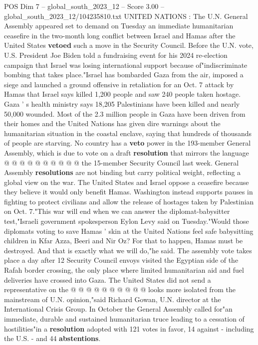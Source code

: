 \begin{textsample}{POS Dim 7 – global\_south\_2023\_12 – Score 3.00 – global\_south\_2023\_12/104235810.txt}  \label{ex:f7_pos_031}
UNITED NATIONS : The U.N.
General Assembly appeared set to demand on Tuesday an immediate humanitarian ceasefire in the two-month long conflict between Israel and Hamas after the United States \textbf{vetoed} such a move in the Security Council.
Before the U.N. vote, U.S.
President Joe Biden told a fundraising event for his 2024 re-election campaign that Israel was losing international support because of"indiscriminate bombing that takes place."Israel has bombarded Gaza from the air, imposed a siege and launched a ground offensive in retaliation for an Oct. 7 attack by Hamas that Israel says killed 1,200 people and saw 240 people taken hostage.
Gaza ' s health ministry says 18,205 Palestinians have been killed and nearly 50,000 wounded.
Most of the 2.3 million people in Gaza have been driven from their homes and the United Nations has given dire warnings about the humanitarian situation in the coastal enclave, saying that hundreds of thousands of people are starving.
No country has a \textbf{veto} power in the 193-member General Assembly, which is due to vote on a draft \textbf{resolution} that mirrors the language @ @ @ @ @ @ @ @ @ @ the 15-member Security Council last week.
General Assembly \textbf{resolutions} are not binding but carry political weight, reflecting a global view on the war.
The United States and Israel oppose a ceasefire because they believe it would only benefit Hamas.
Washington instead supports pauses in fighting to protect civilians and allow the release of hostages taken by Palestinian on Oct. 7."This war will end when we can answer the diplomat-babysitter test,"Israeli government spokesperson Eylon Levy said on Tuesday."Would those diplomats voting to save Hamas ' skin at the United Nations feel safe babysitting children in Kfar Azza, Beeri and Nir Oz?
For that to happen, Hamas must be destroyed.
And that is exactly what we will do,"he said.
The assembly vote takes place a day after 12 Security Council envoys visited the Egyptian side of the Rafah border crossing, the only place where limited humanitarian aid and fuel deliveries have crossed into Gaza.
The United States did not send a representative on the @ @ @ @ @ @ @ @ @ @ looks more isolated from the mainstream of U.N. opinion,"said Richard Gowan, U.N. director at the International Crisis Group.
In October the General Assembly called for"an immediate, durable and sustained humanitarian truce leading to a cessation of hostilities"in a \textbf{resolution} adopted with 121 votes in favor, 14 against - including the U.S. - and 44 \textbf{abstentions}.

\end{textsample}
